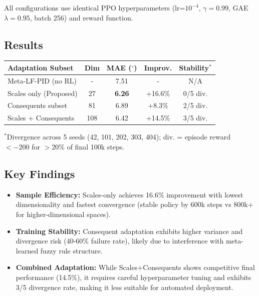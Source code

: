 \documentclass[DTMColor]{ROB-New}
\begin{document}
All configurations use identical PPO hyperparameters (lr=$10^{-4}$, $\gamma=0.99$, GAE $\lambda=0.95$, batch 256) and reward function.

\subsection{Results}

\begin{table}[h]
{\begin{fntable}\centering
\footnotesize
\begin{tabular}{@{}lcccc@{}}
\hline
\textbf{Adaptation Subset} & \textbf{Dim} & \textbf{MAE ($^\circ$)} & \textbf{Improv.} & \textbf{Stability$^*$} \\
\hline
Meta-LF-PID (no RL) & - & 7.51 & - & N/A \\
\hline
Scales only (Proposed) & 27 & \textbf{6.26} & +16.6\% & 0/5 div. \\
Consequents subset & 81 & 6.89 & +8.3\% & 2/5 div. \\
Scales + Consequents & 108 & 6.42 & +14.5\% & 3/5 div. \\
\hline
\end{tabular}
\end{fntable}}
\vspace{0.2cm}

\noindent \footnotesize{$^*$Divergence across 5 seeds (42, 101, 202, 303, 404); div. = episode reward $< -200$ for $>$20\% of final 100k steps.}
\end{table}

\subsection{Key Findings}

\begin{itemize}[leftmargin=*, itemsep=2pt]
    \item \textbf{Sample Efficiency:} Scales-only achieves 16.6\% improvement with lowest dimensionality and fastest convergence (stable policy by 600k steps vs 800k+ for higher-dimensional spaces).
    \item \textbf{Training Stability:} Consequent adaptation exhibits higher variance and divergence risk (40-60\% failure rate), likely due to interference with meta-learned fuzzy rule structure.
    \item \textbf{Combined Adaptation:} While Scales+Consequents shows competitive final performance (14.5\%), it requires careful hyperparameter tuning and exhibits 3/5 divergence rate, making it less suitable for automated deployment.
\end{itemize}
\end{document}
